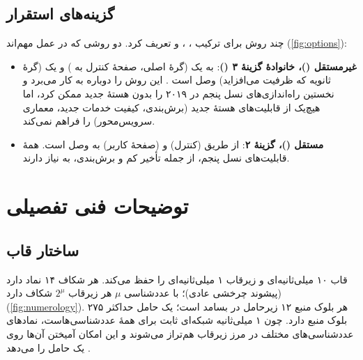 \documentclass[11pt,a4paper]{article}
\begin{document}
\subsection{گزینه‌های استقرار}
 چند روش برای ترکیب ، ،  و  تعریف کرد. دو روشی که در عمل مهم‌اند
(\cref{fig:options}):
\begin{itemize}
  \item \textbf{غیرمستقل ()، خانوادهٔ گزینهٔ ۳ ()}:  به یک   (گرهٔ اصلی، صفحهٔ کنترل
        به ) و یک   (گرهٔ ثانویه که ظرفیت می‌افزاید) وصل است \cite{ts37340}. این روش  را
        دوباره به کار می‌برد و نخستین راه‌اندازی‌های نسل پنجم در ۲۰۱۹ را بدون هستهٔ جدید ممکن کرد، اما هیچ‌یک از قابلیت‌های
        هستهٔ جدید (برش‌بندی، کیفیت خدمات جدید، معماری سرویس‌محور) را فراهم نمی‌کند.
  \item \textbf{مستقل ()، گزینهٔ ۲}:  از طریق  (کنترل) و  (صفحهٔ کاربر) به  وصل
        است. همهٔ قابلیت‌های نسل پنجم، از جمله تأخیر کم و برش‌بندی، به  نیاز دارند.
\end{itemize}

\begin{acnfigure}
  \caption{ غیرمستقل (گزینهٔ ) با  و  مستقل (گزینهٔ ۲) با .}
  \label{fig:options}
\end{acnfigure}

\section{توضیحات فنی تفصیلی}

\subsection{ساختار قاب}
 قاب ۱۰ میلی‌ثانیه‌ای و زیرقاب ۱ میلی‌ثانیه‌ای  را حفظ می‌کند. هر شکاف ۱۴ نماد  دارد (پیشوند
چرخشی عادی)؛ با عددشناسی $\mu$ هر زیرقاب $2^\mu$ شکاف دارد (\cref{fig:numerology}). هر بلوک منبع ۱۲ زیرحامل در بسامد است؛
یک حامل حداکثر ۲۷۵ بلوک منبع دارد. چون ۱ میلی‌ثانیه شبکه‌ای ثابت برای همهٔ عددشناسی‌هاست، نمادهای عددشناسی‌های مختلف در
مرز زیرقاب هم‌تراز می‌شوند و این امکان آمیختن آن‌ها روی یک حامل را می‌دهد \cite{ts38211}.

\begin{acnfigure}
  \caption{تعداد شکاف‌ها در هر زیرقاب ۱ میلی‌ثانیه‌ای برای عددشناسی‌های $\mu = 0$ تا ۳.}
  \label{fig:numerology}
\end{acnfigure}
\end{document}
